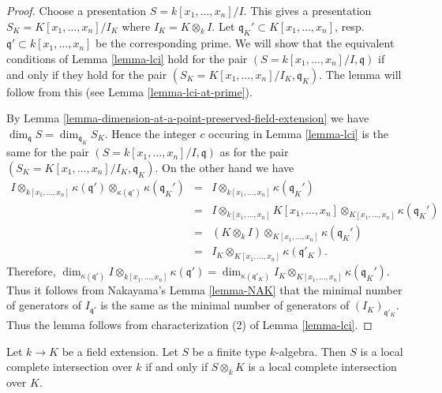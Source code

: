 \begin{proof}
Choose a presentation $S = k[x_1, \ldots, x_n]/I$.
This gives a presentation
$S_K = K[x_1, \ldots, x_n]/I_K$ where $I_K = K\otimes_k I$.
Let $\mathfrak q_K' \subset K[x_1, \ldots, x_n]$,
resp.\ $\mathfrak q' \subset k[x_1, \ldots, x_n]$ be
the corresponding prime. We will show that the equivalent conditions
of Lemma \ref{lemma-lci}
hold for the pair $(S = k[x_1, \ldots, x_n]/I, \mathfrak q)$
if and only if they hold for the pair
$(S_K = K[x_1, \ldots, x_n]/I_K, \mathfrak q_K)$.
The lemma will follow from this (see Lemma \ref{lemma-lci-at-prime}).

\medskip\noindent
By Lemma \ref{lemma-dimension-at-a-point-preserved-field-extension} we have
$\dim_{\mathfrak q} S = \dim_{\mathfrak q_K} S_K$.
Hence the integer $c$ occuring in Lemma \ref{lemma-lci}
is the same for the pair $(S = k[x_1, \ldots, x_n]/I, \mathfrak q)$
as for the pair $(S_K = K[x_1, \ldots, x_n]/I_K, \mathfrak q_K)$.
On the other hand we have
\begin{eqnarray*}
I \otimes_{k[x_1, \ldots, x_n]} \kappa(\mathfrak q')
\otimes_{\kappa(\mathfrak q')} \kappa(\mathfrak q_K')
& = &
I \otimes_{k[x_1, \ldots, x_n]} \kappa(\mathfrak q_K') \\
& = &
I \otimes_{k[x_1, \ldots, x_n]} K[x_1, \ldots, x_n]
\otimes_{K[x_1, \ldots, x_n]} \kappa(\mathfrak q_K') \\
& = &
(K \otimes_k I) \otimes_{K[x_1, \ldots, x_n]} \kappa(\mathfrak q_K') \\
& = &
I_K \otimes_{K[x_1, \ldots, x_n]} \kappa(\mathfrak q'_K).
\end{eqnarray*}
Therefore,
$\dim_{\kappa(\mathfrak q')}
I \otimes_{k[x_1, \ldots, x_n]} \kappa(\mathfrak q')
=
\dim_{\kappa(\mathfrak q'_K)}
I_K \otimes_{K[x_1, \ldots, x_n]} \kappa(\mathfrak q_K')$.
Thus it follows from
Nakayama's Lemma \ref{lemma-NAK} that the minimal number
of generators of $I_{\mathfrak q'}$ is the same as the minimal
number of generators of $(I_K)_{\mathfrak q'_K}$.
Thus the lemma follows from characterization (2) of Lemma \ref{lemma-lci}.
\end{proof}

\begin{lemma}
\label{lemma-lci-field-change}
Let $k \to K$ be a field extension.
Let $S$ be a finite type $k$-algebra.
Then $S$ is a local complete intersection over $k$ if and
only if $S\otimes_k K$ is a local complete intersection over $K$.
\end{lemma}

